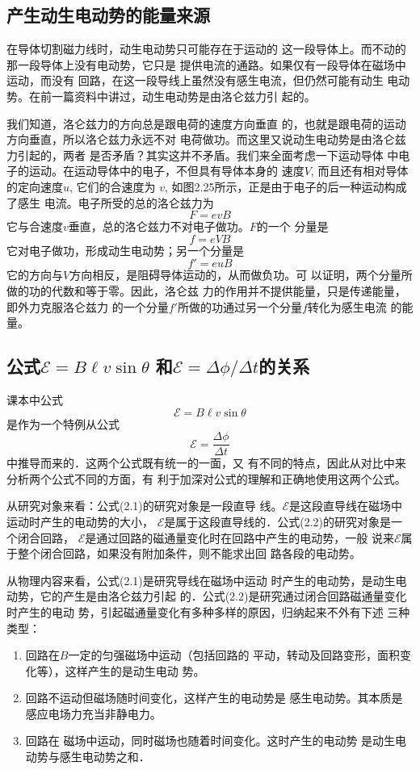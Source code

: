 \subsection{产生动生电动势的能量来源}

在导体切割磁力线时，动生电动势只可能存在于运动的
这一段导体上。而不动的那一段导体上没有电动势，它只是
提供电流的通路。如果仅有一段导体在磁场中运动，而没有
回路，在这一段导线上虽然没有感生电流，但仍然可能有动生
电动势。在前一篇资料中讲过，动生电动势是由洛仑兹力引
起的。


我们知道，洛仑兹力的方向总是跟电荷的速度方向垂直
的，也就是跟电荷的运动方向垂直，所以洛仑兹力永远不对
电荷做功。而这里又说动生电动势是由洛仑兹力引起的，两者
是否矛盾？其实这并不矛盾。我们来全面考虑一下运动导体
中电子的运动。在运动导体中的电子，不但具有导体本身的
速度$V$, 而且还有相对导体的定向速度$u$, 它们的合速度为
$v$, 如图2.25所示，正是由于电子的后一种运动构成了感生
电流。电子所受的总的洛仑兹力为
\[F=evB\]
它与合速度$v$垂直，总的洛仑兹力不对电子做功。$F$的一个
分量是
\[f=eVB\]
它对电子做功，形成动生电动势；另一个分量是
\[f'=euB\]
它的方向与$V$方向相反，是阻碍导体运动的，从而做负功。可
以证明，两个分量所做的功的代数和等于零。因此，洛仑兹
力的作用并不提供能量，只是传递能量，即外力克服洛仑兹力
的一个分量$f'$所做的功通过另一个分量$f$转化为感生电流
的能量。

\subsection{公式$\mathcal{E}=B\ell v\sin\theta$ 和$\mathcal{E}=\Delta\phi/\Delta t$的关系}
课本中公式
\begin{equation}
    \mathcal{E}=B\ell v\sin\theta
\end{equation}
是作为一个特例从公式
\begin{equation}
    \mathcal{E}=\frac{\Delta\phi}{\Delta t}
\end{equation}
中推导而来的．这两个公式既有统一的一面，又
有不同的特点，因此从对比中来分析两个公式不同的方面，有
利于加深对公式的理解和正确地使用这两个公式。

从研究对象来看：公式(2.1)的研究对象是一段直导
线。$\mathcal{E}$是这段直导线在磁场中运动时产生的电动势的大小，
$\mathcal{E}$是属于这段直导线的．公式(2.2)的研究对象是一个闭合回路，
$\mathcal{E}$是通过回路的磁通量变化时在回路中产生的电动势，一般
说来$\mathcal{E}$属于整个闭合回路，如果没有附加条件，则不能求出回
路各段的电动势。

从物理内容来看，公式(2.1)是研究导线在磁场中运动
时产生的电动势，是动生电动势，它的产生是由洛仑兹力引起
的．公式(2.2)是研究通过闭合回路磁通量变化时产生的电动
势，引起磁通量变化有多种多样的原因，归纳起来不外有下述
三种类型：
\begin{enumerate}
\item 回路在$B$一定的匀强磁场中运动（包括回路的
平动，转动及回路变形，面积变化等），这样产生的是动生电动
势。
\item 回路不运动但磁场随时间变化，这样产生的电动势是
感生电动势。其本质是感应电场力充当非静电力。
\item 回路在
磁场中运动，同时磁场也随着时间变化。这时产生的电动势
是动生电动势与感生电动势之和．
\end{enumerate}


